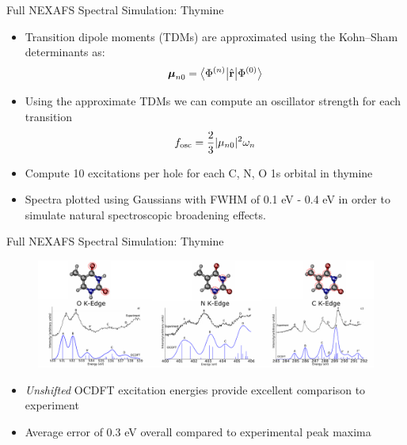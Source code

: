 \documentclass[t]{beamer}
\newcommand{\bra}[2][0]
{\ifthenelse{\equal{#1}{0}}{\left\langle #2 \right|}
{\ifthenelse{\equal{#1}{1}}{\big\langle #2 \big|}
{\ifthenelse{\equal{#1}{2}}{\Big\langle #2 \Big|}
{\ifthenelse{\equal{#1}{3}}{\bigg\langle #2 \bigg|}
{\ifthenelse{\equal{#1}{4}}{\Bigg\langle #2 \Bigg|}
{Error}}}}}
}
\newcommand{\ket}[2][0]
{\ifthenelse{\equal{#1}{0}}{\left| #2 \right\rangle}
{\ifthenelse{\equal{#1}{1}}{\big| #2 \big\rangle}
{\ifthenelse{\equal{#1}{2}}{\Big| #2 \Big\rangle}
{\ifthenelse{\equal{#1}{3}}{\bigg| #2 \bigg\rangle}
{\ifthenelse{\equal{#1}{4}}{\Bigg| #2 \Bigg\rangle}
{Error}}}}}
}
\begin{document}
\begin{frame}{Full NEXAFS Spectral Simulation: Thymine}
\begin{itemize}
\item Transition dipole moments (TDMs) are approximated using the Kohn--Sham determinants as:
\begin{equation}
\boldsymbol{\mu}_{n0} = \bra[1]{\Phi^{(n)}} \hat{\textbf{r}}\ket[1]{\Phi^{(0)}}
\end{equation}
\item Using the approximate TDMs we can compute an oscillator strength for each transition
\begin{equation}
f_{\rm osc} = \frac{2}{3} |\mu_{n0}|^2 \omega_{n}
\end{equation}
\item Compute 10 excitations per hole for each C, N, O 1s orbital in thymine
\item Spectra plotted using Gaussians with FWHM of 0.1 eV - 0.4 eV in order to simulate natural spectroscopic broadening effects.
\end{itemize}
\end{frame}

\begin{frame}{Full NEXAFS Spectral Simulation: Thymine}
\begin{figure}[!t]
\centering
\includegraphics[scale=0.65]{thymine_all_spec.pdf}
\end{figure}
\begin{itemize}
\item \textit{Unshifted} OCDFT excitation energies provide excellent comparison to experiment
\item Average error of 0.3 eV overall compared to experimental peak maxima
\end{itemize}
\end{frame}
\end{document}
